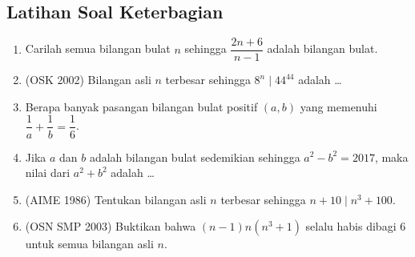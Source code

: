 \subsection{Latihan Soal Keterbagian}
\begin{enumerate}    
    \item Carilah semua bilangan bulat $n$ sehingga $\dfrac{2n+6}{n-1}$ adalah bilangan bulat.
    
    \item (OSK 2002) Bilangan asli $n$ terbesar sehingga $8^n \mid 44^{44}$ adalah \dots
    
    \item Berapa banyak pasangan bilangan bulat positif $(a,b)$ yang memenuhi $\dfrac{1}{a}+\dfrac{1}{b}=\dfrac{1}{6}$.
    
    \item Jika $a$ dan $b$ adalah bilangan bulat sedemikian sehingga $a^2-b^2=2017$, maka nilai dari $a^2+b^2$ adalah \dots
    
    \item (AIME 1986) Tentukan bilangan asli $n$ terbesar sehingga $n+10 \mid n^3+100$.
    
    \item (OSN SMP 2003) Buktikan bahwa $(n-1)n(n^3+1)$ selalu habis dibagi 6 untuk semua bilangan asli $n$.
\end{enumerate}